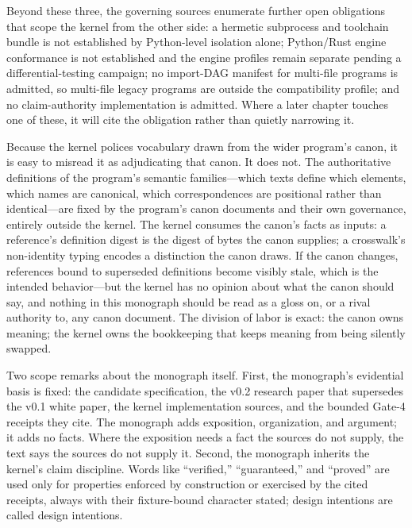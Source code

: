 Beyond these three, the governing sources enumerate further open
obligations that scope the kernel from the other side: a hermetic
subprocess and toolchain bundle is not established by Python-level
isolation alone; Python/Rust engine conformance is not established and
the engine profiles remain separate pending a differential-testing
campaign; no import-DAG manifest for multi-file programs is admitted,
so multi-file legacy programs are outside the compatibility profile; and
no claim-authority implementation is admitted. Where a later chapter
touches one of these, it will cite the obligation rather than quietly
narrowing it.

\begin{remark}\label{ch01:relation}
Because the kernel polices vocabulary drawn from the wider program's
canon, it is easy to misread it as adjudicating that canon. It does
not. The authoritative definitions of the program's semantic
families---which texts define which elements, which names are
canonical, which correspondences are positional rather than
identical---are fixed by the program's canon documents and their own
governance, entirely outside the kernel. The kernel consumes the
canon's facts as inputs: a reference's definition digest is the digest
of bytes the canon supplies; a crosswalk's non-identity typing encodes
a distinction the canon draws. If the canon changes, references bound
to superseded definitions become visibly stale, which is the intended
behavior---but the kernel has no opinion about what the canon should
say, and nothing in this monograph should be read as a gloss on, or a
rival authority to, any canon document. The division of labor is
exact: the canon owns meaning; the kernel owns the bookkeeping that
keeps meaning from being silently swapped.
\end{remark}

Two scope remarks about the monograph itself. First, the monograph's
evidential basis is fixed: the candidate specification, the v0.2
research paper that supersedes the v0.1 white paper, the kernel
implementation sources, and the bounded Gate-4 receipts they cite. The
monograph adds exposition, organization, and argument; it adds no facts.
Where the exposition needs a fact the sources do not supply, the text
says the sources do not supply it. Second, the monograph inherits the
kernel's claim discipline. Words like ``verified,'' ``guaranteed,'' and
``proved'' are used only for properties enforced by construction or
exercised by the cited receipts, always with their fixture-bound
character stated; design intentions are called design intentions.

